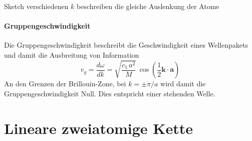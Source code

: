 \begin{marginfigure}
\caption{Sketch verschiedenen $k$ beschreiben die gleiche Auslenkung der Atome}
\end{marginfigure}

\paragraph{Gruppengeschwindigkeit}
Die Gruppengeschwindigkeit beschreibt die Geschwindigkeit eines Wellenpakets und damit die Ausbreitung von Information
\begin{equation}
v_g = \frac{d \omega}{d k} =
 \sqrt{\frac{c_1 \, a^2}{M} } \, \cos 
 \left( \frac{1}{2} \mathbf{k} \cdot \mathbf{a} \right)
\end{equation}
An den Grenzen der Brillouin-Zone, bei $k = \pm \pi / a$ wird damit die Gruppengeschwindigkeit Null. Dies entspricht einer stehenden Welle.


\section{Lineare zweiatomige Kette}

